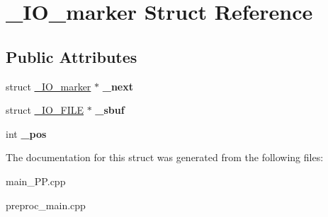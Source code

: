 \hypertarget{struct__IO__marker}{\section{\+\_\+\+I\+O\+\_\+marker Struct Reference}
\label{struct__IO__marker}
}
\subsection*{Public Attributes}
\begin{DoxyCompactItemize}
\item 
\hypertarget{struct__IO__marker_a89ef5d2fd7550af75be0f659d8c9b4cd}{struct \hyperlink{struct__IO__marker}{\+\_\+\+I\+O\+\_\+marker} $\ast$ {\bfseries \+\_\+next}}\label{struct__IO__marker_a89ef5d2fd7550af75be0f659d8c9b4cd}

\item 
\hypertarget{struct__IO__marker_a22a90f010ddf7a54200e21ff02336cd9}{struct \hyperlink{struct__IO__FILE}{\+\_\+\+I\+O\+\_\+\+F\+I\+L\+E} $\ast$ {\bfseries \+\_\+sbuf}}\label{struct__IO__marker_a22a90f010ddf7a54200e21ff02336cd9}

\item 
\hypertarget{struct__IO__marker_a3f83a64703190d685175dc43b9e122a6}{int {\bfseries \+\_\+pos}}\label{struct__IO__marker_a3f83a64703190d685175dc43b9e122a6}

\end{DoxyCompactItemize}


The documentation for this struct was generated from the following files\+:\begin{DoxyCompactItemize}
\item 
main\+\_\+\+P\+P.\+cpp\item 
preproc\+\_\+main.\+cpp\end{DoxyCompactItemize}
